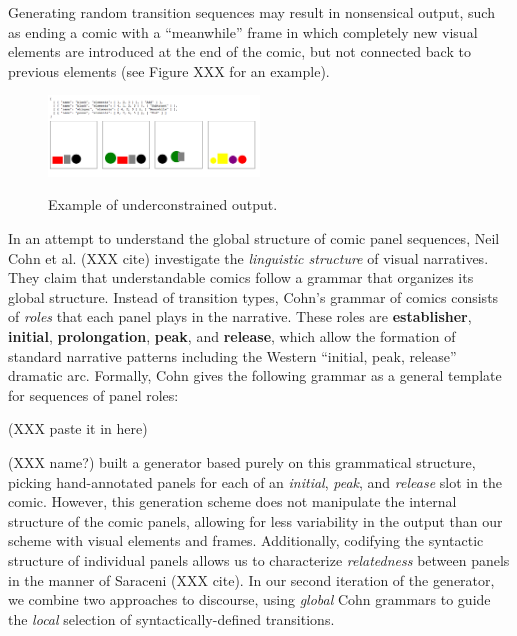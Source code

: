 Generating random transition sequences may result in nonsensical output,
such as ending a comic with a ``meanwhile'' frame in which completely new
visual elements are introduced at the end of the comic, but not connected
back to previous elements (see Figure XXX for an example). 


\begin{figure}
\caption{Example of underconstrained output.}
\includegraphics[width=0.5\textwidth]{comicgen-underconstrained-2.png}
\label{fig:out1}
\end{figure}

In an attempt to understand the global structure of comic panel sequences,
Neil Cohn et al. (XXX cite) investigate the {\em linguistic structure} of
visual narratives. They claim that understandable comics follow a grammar
that organizes its global structure. Instead of transition types, Cohn's
grammar of comics consists of {\em roles} that each panel plays in the
narrative. These roles are {\bf establisher}, {\bf initial}, {\bf
prolongation}, {\bf peak}, and {\bf release}, which allow the formation of
standard narrative patterns including the Western ``initial, peak,
release'' dramatic arc. Formally, Cohn gives the following grammar 
as a general template for sequences of panel roles:

(XXX paste it in here)

(XXX name?) built a generator based purely on this
grammatical structure, picking hand-annotated panels for each of an {\em
initial}, {\em peak}, and {\em release} slot in the comic. However, this
generation scheme does not manipulate the internal structure of the comic
panels, allowing for less variability in the output than our scheme with
visual elements and frames. Additionally, codifying the syntactic structure
of individual panels allows us to characterize {\em relatedness} between
panels in the manner of Saraceni (XXX cite). In our second iteration of the
generator, we combine two approaches to discourse, using {\em global} Cohn
grammars to guide the {\em local} selection of syntactically-defined
transitions.


